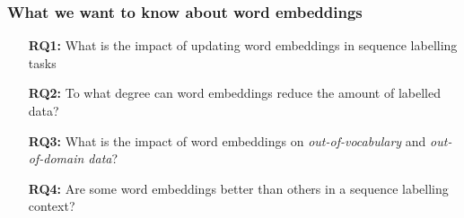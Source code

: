 \documentclass{beamer}
\begin{document}
\begin{frame}
\frametitle{\textbf{What we want to know about word embeddings}}

\begin{itemize}
\item[\bf RQ1:] What is the impact of updating word embeddings in sequence
  labelling tasks
\item[]
\item[\bf RQ2:] 
To what degree can word embeddings reduce the amount of labelled data?
\item[]
\item[\bf RQ3:] What is the impact of word embeddings on \textit{out-of-vocabulary} and \textit{out-of-domain data}?
\item[]
\item[\bf RQ4:] Are some word embeddings better than others in a sequence labelling context?
\item[]
\end{itemize}
\end{frame}
\end{document}
